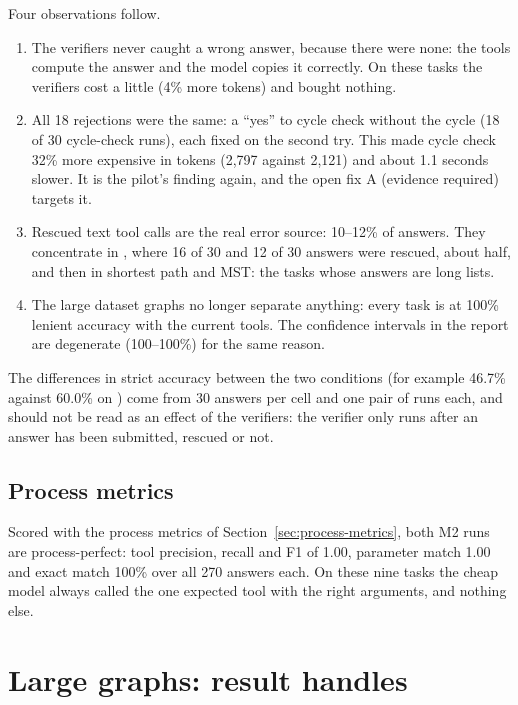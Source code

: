 Four observations follow.
\begin{enumerate}
  \item The verifiers never caught a wrong answer, because there were none: the tools compute the answer and the
        model copies it correctly. On these tasks the verifiers cost a little (4\% more tokens) and bought nothing.
  \item All 18 rejections were the same: a ``yes'' to cycle check without the cycle (18 of 30 cycle-check runs), each
        fixed on the second try. This made cycle check 32\% more expensive in tokens (2,797 against 2,121) and about
        1.1 seconds slower. It is the pilot's finding again, and the open fix A (evidence required) targets it.
  \item Rescued text tool calls are the real error source: 10--12\% of answers. They concentrate in
        , where 16 of 30 and 12 of 30 answers were rescued, about half, and then in shortest
        path and MST: the tasks whose answers are long lists.
  \item The large dataset graphs no longer separate anything: every task is at 100\% lenient accuracy with the
        current tools. The confidence intervals in the report are degenerate (100--100\%) for the same reason.
\end{enumerate}
The differences in strict accuracy between the two conditions (for example 46.7\% against 60.0\% on
) come from 30 answers per cell and one pair of runs each, and should not be read as an effect
of the verifiers: the verifier only runs after an answer has been submitted, rescued or not.

\subsection{Process metrics}

Scored with the process metrics of Section~\ref{sec:process-metrics}, both M2 runs are process-perfect: tool precision,
recall and F1 of 1.00, parameter match 1.00 and exact match 100\% over all 270 answers each. On these nine tasks the
cheap model always called the one expected tool with the right arguments, and nothing else.

\section{Large graphs: result handles}

